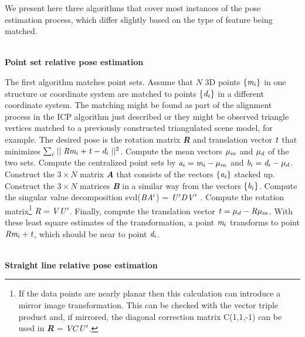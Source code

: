 \documentclass[twocolumn,oneside]{book}
\begin{document}
We present here three algorithms that cover most instances of 
the pose estimation process,
which differ slightly based on the type of feature being matched.

\ \\
\noindent
{\bf Point set relative pose estimation}

The first algorithm matches point sets. Assume that $N$ 3D points
$\{ {\bf \it m}_i\}$ in one structure or coordinate system 
are matched to points $\{ {\bf \it d}_i\}$ in a different coordinate system.
The matching might be found as part of the alignment process in the
ICP algorithm just described or they might be observed triangle vertices
matched to a previously constructed triangulated scene model, for example.
The desired pose is the rotation matrix {\bf \it R} and translation vector
${\bf \it t}$ that minimizes $\sum_i \mid\mid {\bf \it R}{\bf \it m}_i + {\bf \it t} - {\bf \it d}_i \mid\mid^2$.
Compute the mean vectors ${\bf \it \mu}_m$ and ${\bf \it \mu}_d$ of the two sets.
Compute the centralized point sets by
${\bf \it a}_i = {\bf \it m}_i - {\bf \it \mu}_m$ and
${\bf \it b}_i = {\bf \it d}_i - {\bf \it \mu}_d$.
Construct the $3 \times N$ matrix {\bf \it A} that consists
of the vectors $\{ {\bf \it a}_i \}$ stacked up.
Construct the $3 \times N$ matrices {\bf \it B} in a similar way from the
vectors $\{ {\bf \it b}_i \}$.
Compute the singular value decomposition svd(${\bf \it B}{\bf \it A'}$) = 
${\bf \it U'}{\bf \it D}{\bf \it V'}$ \cite{arun}.
Compute the rotation matrix\footnote{If the data points are nearly planar
then this calculation can introduce a mirror image transformation.
This can be checked with the vector triple product and,
if mirrored, the diagonal correction matrix C(1,1,-1) can be used in
{\bf \it R} = ${\bf \it V}{\bf \it C}{\bf \it U'}$.}
${\bf \it R} = {\bf \it V}{\bf \it U'}$.
Finally, compute the translation vector ${\bf \it t} = {\bf \it \mu}_d - {\bf \it R}{\bf \it \mu}_m$.
With these least square estimates of the transformation, a point ${\bf \it m}_i$
transforms to point ${\bf \it R}{\bf \it m}_i + {\bf \it t}$, which should
be near to point ${\bf \it d}_i$.

\ \\
\noindent
{\bf Straight line relative pose estimation}
\end{document}
